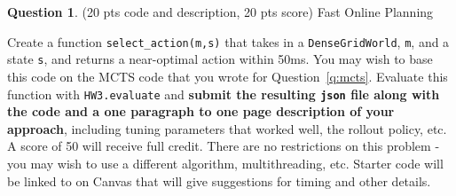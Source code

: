 \documentclass{article}
\theoremstyle{definition}
\newtheorem{question}[thm]{Question}
\begin{document}
\begin{question}
    (20 pts code and description, 20 pts score) Fast Online Planning
    
Create a function \texttt{select\_action(m,s)} that takes in a \texttt{DenseGridWorld}, \texttt{m}, and a state \texttt{s}, and returns a near-optimal action within 50ms. You may wish to base this code on the MCTS code that you wrote for Question~\ref{q:mcts}. Evaluate this function with \texttt{HW3.evaluate} and \textbf{submit the resulting \texttt{json} file along with the code and a one paragraph to one page description of your approach}, including tuning parameters that worked well, the rollout policy, etc. A score of 50 will receive full credit. There are no restrictions on this problem - you may wish to use a different algorithm, multithreading, etc. Starter code will be linked to on Canvas that will give suggestions for timing and other details.
\end{question}
\end{document}
